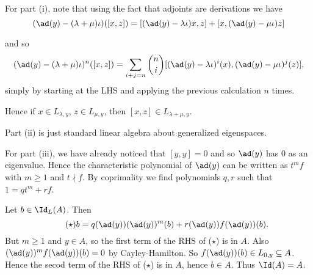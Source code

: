 For part (i), note that using the fact that adjoints are
derivations we have
\[ (\ad(y) - (\lambda+\mu)\iota)([x, z]) = [(\ad(y) - \lambda\iota)x, z] +
		[x, (\ad(y)-\mu\iota)z] \]

and so
\[ (\ad(y) - (\lambda + \mu)\iota)^n([x, z]) = \sum_{i + j = n}\binom{n}{i}[(\ad(y) - \lambda\iota)^i(x), (\ad(y) - \mu\iota)^j(z)], \]
simply by starting at the LHS and applying the previous calculation $n$ times.

Hence if $x \in L_{\lambda, y}$, $z \in L_{\mu, y}$, then
$[x, z] \in L_{\lambda + \mu, y}$.

Part (ii) is just standard linear algebra about generalized eigenspaces.

For part (iii), we have already noticed that $[y, y] = 0$ and so $\ad(y)$
has $0$ as an eigenvalue. Hence the characteristic polynomial of $\ad(y)$ can
be written as $t^mf$ with $m\geq 1$ and $t\nmid f$. By coprimality we find
polynomials $q, r$ such that $1 = qt^m + rf$.

Let $b \in \Id_L(A)$. Then
\begin{equation*}\tag{$\star$}
b = q(\ad(y))(\ad(y))^m(b) + r(\ad(y))f(\ad(y))(b).
\end{equation*}
But $m\geq 1$ and $y \in A$, so the first term of the RHS of ($\star$) is in $A$.
Also $(\ad(y))^mf(\ad(y))(b) = 0$ by Cayley-Hamilton. So
$f(\ad(y))(b) \in L_{0, y} \subseteq A$. Hence the secod term of the RHS of
($\star$) is in $A$, hence $b \in A$. Thus $\Id(A) = A$.
